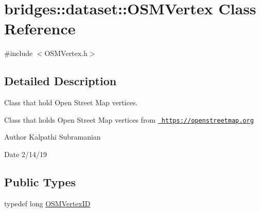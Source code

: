 \hypertarget{classbridges_1_1dataset_1_1_o_s_m_vertex}{}\section{bridges\+::dataset\+::O\+S\+M\+Vertex Class Reference}
\label{classbridges_1_1dataset_1_1_o_s_m_vertex}


{\ttfamily \#include $<$O\+S\+M\+Vertex.\+h$>$}



\subsection{Detailed Description}
Class that hold Open Street Map vertices. 

Class that holds Open Street Map vertices from \href{https://openstreetmap.org}{\texttt{ https\+://openstreetmap.\+org}}

\begin{DoxyAuthor}{Author}
Kalpathi Subramanian 
\end{DoxyAuthor}
\begin{DoxyDate}{Date}
2/14/19 
\end{DoxyDate}
\subsection*{Public Types}
\begin{DoxyCompactItemize}
\item 
typedef long \mbox{\hyperlink{classbridges_1_1dataset_1_1_o_s_m_vertex_ad166f13b0aefbdc05a273546f2a3bb96}{O\+S\+M\+Vertex\+ID}}
\end{DoxyCompactItemize}
